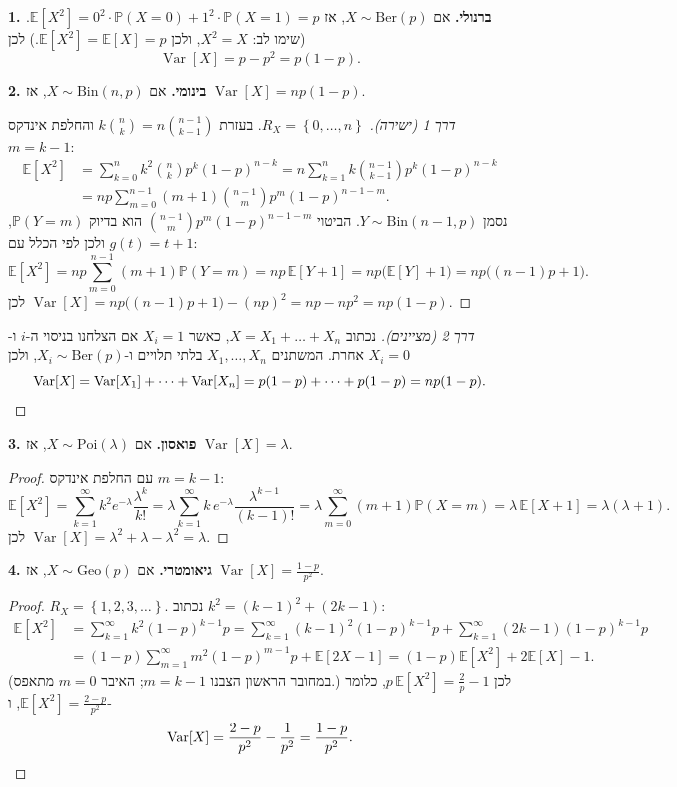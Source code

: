 \documentclass[11pt,a4paper]{report}
\newcommand{\flag}{\tikz[baseline=-0.1ex,x=0.9ex,y=0.9ex]{\draw[line width=0.5pt] (0,-0.3)--(0,1.6); \fill (0,1.6)--(1.2,1.2)--(0,0.8)--cycle;}}
\newcounter{todo}
\newcommand{\addtodo}[1]{\refstepcounter{todo}%
  \addcontentsline{tdo}{todo}{\protect\numberline{\thetodo}#1}}
\newcommand{\needcheck}[1]{\addtodo{#1}%
  {\color{todoc}\sffamily\small\,[\textbf{\flag{}\,\thetodo\ לבדיקה:} #1]\,}}
\renewcommand{\needcheck}[1]{}
\newcommand{\set}[1]{\left\{#1\right\}}
\newcommand{\PP}{\mathbb{P}}
\newcommand{\E}{\mathbb{E}}
\DeclareMathOperator{\Var}{Var}
\newcommand{\Ber}{\mathrm{Ber}}
\newcommand{\Bin}{\mathrm{Bin}}
\newcommand{\Geo}{\mathrm{Geo}}
\newcommand{\Poi}{\mathrm{Poi}}
\begin{document}
\textbf{1. ברנולי.} אם $X\sim\Ber(p)$, אז $\E[X^2]=0^2\cdot\PP(X=0)+1^2\cdot\PP(X=1)=p$. (שימו לב: $X^2=X$, ולכן $\E[X^2]=\E[X]=p$.) לכן
\[
  \Var[X]=p-p^2=p(1-p).
\]
\needcheck{ברשימות נכתב $\Var[X^2]=p(1-p)$; הכוונה ל-$\Var[X]$}

\textbf{2. בינומי.} אם $X\sim\Bin(n,p)$, אז $\Var[X]=np(1-p)$.
\begin{proof}[דרך 1 (ישירה)]
$R_X=\set{0,\dots,n}$. בעזרת $k\binom nk=n\binom{n-1}{k-1}$ והחלפת אינדקס $m=k-1$:
\begin{align*}
  \E[X^2]&=\sum_{k=0}^nk^2\binom nkp^k(1-p)^{n-k}=n\sum_{k=1}^nk\binom{n-1}{k-1}p^k(1-p)^{n-k}\\
  &=np\sum_{m=0}^{n-1}(m+1)\binom{n-1}{m}p^m(1-p)^{n-1-m}.
\end{align*}
נסמן $Y\sim\Bin(n-1,p)$. הביטוי $\binom{n-1}mp^m(1-p)^{n-1-m}$ הוא בדיוק $\PP(Y=m)$, ולכן לפי הכלל עם $g(t)=t+1$:
\[
  \E[X^2]=np\sum_{m=0}^{n-1}(m+1)\PP(Y=m)=np\,\E[Y+1]=np\big(\E[Y]+1\big)=np\big((n-1)p+1\big).
\]
לכן $\Var[X]=np\big((n-1)p+1\big)-(np)^2=np-np^2=np(1-p)$.
\end{proof}
\begin{proof}[דרך 2 (מציינים)]
נכתוב $X=X_1+\dots+X_n$, כאשר $X_i=1$ אם הצלחנו בניסוי ה-$i$ ו-$X_i=0$ אחרת. המשתנים $X_1,\dots,X_n$ בלתי תלויים ו-$X_i\sim\Ber(p)$, ולכן
\[
  \Var[X]=\Var[X_1]+\dots+\Var[X_n]=p(1-p)+\dots+p(1-p)=np(1-p).\qedhere
\]
\end{proof}

\textbf{3. פואסון.} אם $X\sim\Poi(\lambda)$, אז $\Var[X]=\lambda$.
\begin{proof}
עם החלפת אינדקס $m=k-1$:
\[
  \E[X^2]=\sum_{k=1}^\infty k^2e^{-\lambda}\frac{\lambda^k}{k!}=\lambda\sum_{k=1}^\infty k\,e^{-\lambda}\frac{\lambda^{k-1}}{(k-1)!}
  =\lambda\sum_{m=0}^\infty(m+1)\PP(X=m)=\lambda\,\E[X+1]=\lambda(\lambda+1).
\]
לכן $\Var[X]=\lambda^2+\lambda-\lambda^2=\lambda$.
\end{proof}

\textbf{4. גיאומטרי.} אם $X\sim\Geo(p)$, אז $\Var[X]=\frac{1-p}{p^2}$.
\begin{proof}
$R_X=\set{1,2,3,\dots}$. נכתוב $k^2=(k-1)^2+(2k-1)$:
\begin{align*}
  \E[X^2]&=\sum_{k=1}^\infty k^2(1-p)^{k-1}p=\sum_{k=1}^\infty(k-1)^2(1-p)^{k-1}p+\sum_{k=1}^\infty(2k-1)(1-p)^{k-1}p\\
  &=(1-p)\sum_{m=1}^\infty m^2(1-p)^{m-1}p+\E[2X-1]=(1-p)\E[X^2]+2\E[X]-1.
\end{align*}
(במחובר הראשון הצבנו $m=k-1$; האיבר $m=0$ מתאפס.) לכן $p\,\E[X^2]=\frac2p-1$, כלומר $\E[X^2]=\frac{2-p}{p^2}$, ו-
\[
  \Var[X]=\frac{2-p}{p^2}-\frac1{p^2}=\frac{1-p}{p^2}.\qedhere
\]
\end{proof}
\end{document}

